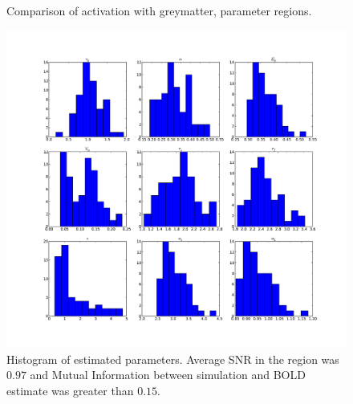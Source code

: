 \documentclass[journal]{./IEEEtran}
\begin{document}
\begin{figure}[!t]
\hfil
{}
\caption{Comparison of activation with greymatter, parameter regions.}
\label{fig:simslice_hm}
\end{figure}

\begin{figure}[!t] %
\centering
\includegraphics[clip=true,trim=2.5cm 2cm 2cm 1cm,width=15cm]{images/slicesim_hist2}
\caption{Histogram of estimated parameters. Average SNR in the region was 
$0.97$ and Mutual Information between simulation and BOLD estimate was greater 
than $0.15$.}
\label{fig:slicesim_hist2}
\end{figure}
\end{document}
